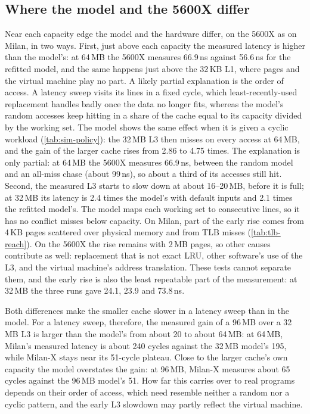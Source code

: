 \subsection*{Where the model and the 5600X differ}
\label{app:5600x-shapes}
Near each capacity edge the model and the hardware differ, on the 5600X as on Milan, in two ways. First, just above each capacity the measured latency is higher than the model's: at 64\,MB the 5600X measures 66.9\,ns against 56.6\,ns for the refitted model, and the same happens just above the 32\,KB L1, where pages and the virtual machine play no part. A likely partial explanation is the order of access. A latency sweep visits its lines in a fixed cycle, which least-recently-used replacement handles badly once the data no longer fits, whereas the model's random accesses keep hitting in a share of the cache equal to its capacity divided by the working set. The model shows the same effect when it is given a cyclic workload (\cref{tab:sim-policy}): the 32\,MB L3 then misses on every access at 64\,MB, and the gain of the larger cache rises from 2.86 to 4.75 times. The explanation is only partial: at 64\,MB the 5600X measures 66.9\,ns, between the random model and an all-miss chase (about 99\,ns), so about a third of its accesses still hit. Second, the measured L3 starts to slow down at about 16--20\,MB, before it is full; at 32\,MB its latency is 2.4 times the model's with default inputs and 2.1 times the refitted model's. The model maps each working set to consecutive lines, so it has no conflict misses below capacity. On Milan, part of the early rise comes from 4\,KB pages scattered over physical memory and from TLB misses (\cref{tab:tlb-reach}). On the 5600X the rise remains with 2\,MB pages, so other causes contribute as well: replacement that is not exact LRU, other software's use of the L3, and the virtual machine's address translation. These tests cannot separate them, and the early rise is also the least repeatable part of the measurement: at 32\,MB the three runs gave 24.1, 23.9 and 73.8\,ns.

Both differences make the smaller cache slower in a latency sweep than in the model. For a latency sweep, therefore, the measured gain of a 96\,MB over a 32\,MB L3 is larger than the model's from about 20 to about 64\,MB: at 64\,MB, Milan's measured latency is about 240 cycles against the 32\,MB model's 195, while Milan-X stays near its 51-cycle plateau. Close to the larger cache's own capacity the model overstates the gain: at 96\,MB, Milan-X measures about 65 cycles against the 96\,MB model's 51. How far this carries over to real programs depends on their order of access, which need resemble neither a random nor a cyclic pattern, and the early L3 slowdown may partly reflect the virtual machine.

